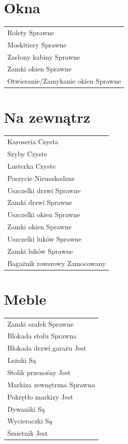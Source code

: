 \documentclass{article}
\begin{document}
\begin{multicols}{2}
\section{Okna}
\begin{tabularx}{\columnwidth}{|X|}
\hline
Rolety \dotfill Sprawne \\
Moskitiery \dotfill Sprawne \\
Zasłony kabiny \dotfill Sprawne \\
Zamki okien \dotfill Sprawne \\
Otwieranie/Zamykanie okien \dotfill Sprawne \\
\hline
\end{tabularx}

\section{Na zewnątrz}
\begin{tabularx}{\columnwidth}{|X|}
\hline
Karoseria \dotfill Czysta \\
Szyby \dotfill Czyste \\
Lusterka \dotfill Czyste \\
Poszycie \dotfill Nieuszkodzne \\
Uszczelki drzwi \dotfill Sprawne \\
Zamki drzwi \dotfill Sprawne \\
Uszczelki okien \dotfill Sprawne \\
Zamki okien \dotfill Sprawne \\
Uszczelki luków \dotfill Sprawne \\
Zamki luków \dotfill Sprawne \\
Bagażnik rowerowy \dotfill Zamocowany \\
\hline
\end{tabularx}


\section{Meble}
\begin{tabularx}{\columnwidth}{|X|}
\hline
Zamki szafek \dotfill Sprawne \\
Blokada stołu \dotfill Sprawna \\
Blokada drzwi garażu \dotfill Jest \\
Leżaki \dotfill Są \\
Stolik przenośny \dotfill Jest \\
Markiza zewnętrzna \dotfill Sprawna \\
Pokrętło markizy \dotfill Jest \\
Dywaniki \dotfill Są \\
Wycieraczki \dotfill Są \\
Śmietnik \dotfill Jest \\
\hline
\end{tabularx}


\end{multicols}
\end{document}
